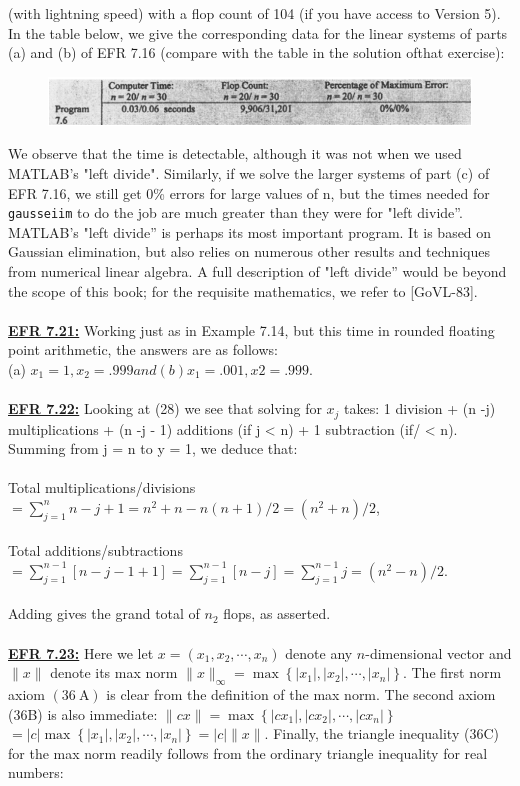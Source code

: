 \documentclass[../main.tex]{subfiles}
\begin{document}
(with lightning speed) with a flop count of 104 (if you have access to Version 5). In the table below, 
we give the corresponding data for the linear systems of parts (a) and (b) of EFR 7.16 (compare with 
the table in the solution ofthat exercise):
\begin{figure}[H]
    \centering
    \includegraphics[width=1\linewidth]{47}
    \label{pfig:ch13_47}
\end{figure} 
We observe that the time is detectable, although it was not when we used MATLAB's "left divide". 
Similarly, if we solve the larger systems of part (c) of EFR 7.16, we still get 0\% errors for large values 
of n, but the times needed for \texttt{gausseiim} to do the job are much greater than they were for "left 
divide''. MATLAB's "left divide'' is perhaps its most important program. It is based on Gaussian 
elimination, but also relies on numerous other results and techniques from numerical linear algebra. A 
full description of "left divide'' would be beyond the scope of this book; for the requisite mathematics, 
we refer to [GoVL-83]. 
\\
\\
\textbf{\underline{EFR 7.21:}} Working just as in Example 7.14, but this time in rounded floating point arithmetic, the answers are as follows:\\
(a) $x_1 = 1, x_2 =.999 and (b) x_1 = .001, x2 = .999.$
\\
\\
\textbf{\underline{EFR 7.22:}}  Looking at (28) we see that solving for $x_j$ takes: 1 division + (n -j) multiplications + 
(n -j - 1) additions (if j < n) + 1 subtraction (if/ < n). 
Summing from j = n to y = 1, we deduce that: \\
\\
Total multiplications/divisions $=\sum_{j=1}^{n} n-j+1=n^{2}+n-n(n+1) / 2=\left(n^{2}+n\right) / 2$,
\\
\\
Total additions/subtractions $=\sum_{j=1}^{n-1}[n-j-1+1]=\sum_{j=1}^{n-1}[n-j]=\sum_{j=1}^{n-1} j=\left(n^{2}-n\right) / 2$.\\
\\
Adding gives the grand total of $n_2$ flops, as asserted.
\\
\\
\textbf{\underline{EFR 7.23:}} Here we let $x=\left(x_{1}, x_{2}, \cdots, x_{n}\right)$ denote any $n$-dimensional vector and $\|x\|$ denote its max norm $\|x\|_{\infty}=\max \left\{\left|x_{1}\right|,\left|x_{2}\right|, \cdots,\left|x_{n}\right|\right\}$. The first norm axiom $(36 \mathrm{~A})$ is clear from the definition of the max norm. The second axiom (36B) is also immediate: $\|c x\|=\max \left\{\left|c x_{1}\right|,\left|c x_{2}\right|, \cdots,\left|c x_{n}\right|\right\}$ $=|c| \max \left\{\left|x_{1}\right|,\left|x_{2}\right|, \cdots,\left|x_{n}\right|\right\}=|c|\|x\|$. Finally, the triangle inequality (36C) for the max norm readily follows from the ordinary triangle inequality for real numbers:
\end{document}
